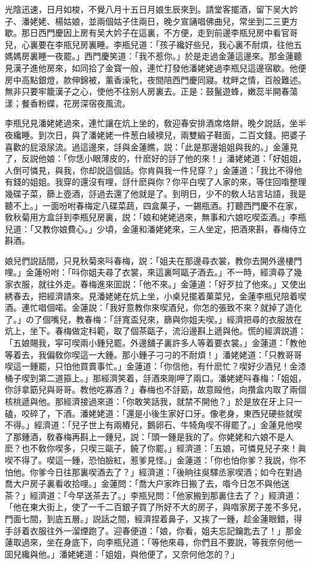 光陰迅速，日月如梭，不覺八月十五日月娘生辰來到。請堂客擺酒，留下吴大妗子、潘姥姥、楊姑娘，並兩個姑子住兩日，晚夕宣誦唱佛曲兒，常坐到二三更方歇。那日西門慶因上房有吴大妗子在這裏，不方便，走到前邊李瓶兒房中看官哥兒，心裏要在李瓶兒房裏睡。李瓶兒道：「孩子纔好些兒，我心裏不耐煩，往他五媽媽房裏睡一夜罷。」西門慶笑道：「我不惹你。」於是走過金蓮這邊來。那金蓮聽見漢子進他房來，如同拾了金寳一般，連忙打發他潘姥姥過李瓶兒這邊宿歇。他便房中高點銀燈，款伸錦被，薰香澡牝，夜間陪西門慶同寢。枕畔之情，百般難述。無非只要牢籠漢子之心，使他不往别人房裏去。正是：鼓鬣遊蜂，嫩蕊半開春蕩漾；餐香粉蝶，花房深宿夜風流。

李瓶兒見潘姥姥過來，連忙讓在炕上坐的，敎迎春安排酒席烙餅，晚夕説話，坐半夜纔睡。到次日，與了潘姥姥一件葱白綾襖兒，兩雙緞子鞋面，二百文錢。把婆子喜歡的屁滾尿流。過這邊來，㧱與金蓮瞧，説：「此是那邊姐姐與我的。」金蓮見了，反説他娘：「你恁小眼薄皮的，什麽好的㧱了他的來！」潘姥姥道：「好姐姐，人倒可憐見，與我，你却説這個話。你肯與我一件兒穿？」金蓮道：「我比不得他有錢的姐姐。我穿的還沒有哩，㧱什麽與你？你平白喫了人家的來，等住回喒整理幾碟子菜，篩上壺酒，㧱過去還了他就是了。到明日，少不的敎人玷言玷語，我是聽不上。」一面吩咐春梅定八碟菜蔬，四盒菓子，一錫瓶酒。打聽西門慶不在家，敎秋菊用方盒㧱到李瓶兒房裏，説：「娘和姥姥過來，無事和六娘吃喫盃酒。」李瓶兒道：「又教你娘費心。」少頃，金蓮和潘姥姥來，三人坐定，把酒來斟，春梅侍立斟酒。

娘兒們説話間，只見秋菊來呌春梅，説：「姐夫在那邊尋衣裳，教你去開外邊樓門哩。」金蓮吩咐：「呌你姐夫尋了衣裳，來這裏呵甌子酒去。」不一時，經濟尋了幾家衣服，就往外走。春梅進來囬説：「他不來。」金蓮道：「好歹拉了他來。」又使出綉春去，把經濟請來。見潘姥姥在炕上坐，小桌兒擺着菓菜兒，金蓮李瓶兒陪着喫酒。連忙唱個喏。金蓮説：「我好意教你來喫酒兒，你怎的張致不來？就掉了造化了。」の了個嘴兒，教春梅：「㧱寬盃兒來，篩與你姐夫喫。」經濟把尋的衣服放在炕上，坐下。春梅做定科範，取了個茶甌子，流沿邊斟上遞與他。慌的經濟説道：「五娘賜我，寜可喫兩小鍾兒罷。外邊舖子裏許多人等着要衣裳。」金蓮道：「教他等着去，我偏敎你喫這一大鍾。那小鍾子刁刁的不耐煩！」潘姥姥道：「只教哥哥喫這一鍾罷，只怕他買賣事忙。」金蓮道：「你信他，有什麽忙？喫好少酒兒！金漆桶子喫到第二道箍上。」那經濟笑着，㧱酒來剛呷了兩口。潘姥姥呌春梅：「姐姐，你㧱拿筯兒與哥哥。教他吃寡酒？」春梅也不㧱筯，故意毆他，向攢盒内取了兩個核桃遞與他。那經濟接過來道：「你敢笑話我，就禁不開他？」於是放在牙上只一磕，咬碎了，下酒。潘姥姥道：「還是小後生家好口牙。像老身，東西兒硬些就喫不得。」經濟道：「兒子世上有兩樁兒，鵝卵石、牛犄角喫不得罷了。」金蓮見他喫了那鍾酒，敎春梅再斟上一鍾兒，説：「頭一鍾是我的了。你姥姥和六娘不是人麽？也不敎你喫多，只喫三甌子，饒了你罷。」經濟道：「五娘，可憐見兒子來！眞喫不得了。喫這一鍾，恐怕臉紅，惹爹見怪。」金蓮道：「你也怕你爹？我説，你不怕他。你爹今日往那裏喫酒去了？」經濟道：「後晌往吳驛丞家喫酒；如今在對過喬大户房子裏看收拾哩。」金蓮問：「喬大户家昨日搬了去，喒今日怎不與他送茶？」經濟道：「今早送茶去了。」李瓶兒問：「他家搬到那裏住去了？」經濟道：「他在東大街上，使了一千二百銀子買了所好不大的房子，與喒家房子差不多兒，門面七間，到底五層。」説話之間，經濟捏着鼻子，又挨了一鍾，趁金蓮眼錯，得手㧱着衣服往外一溜煙跑了。迎春便道：「娘，你看，姐夫忘記鑰匙去了！」那金蓮取過來，坐在身底下，向李瓶兒道：「等他來尋，你們且不要説，等我奈何他一囬兒纔與他。」潘姥姥道：「姐姐，與他便了，又奈何他怎的？」

